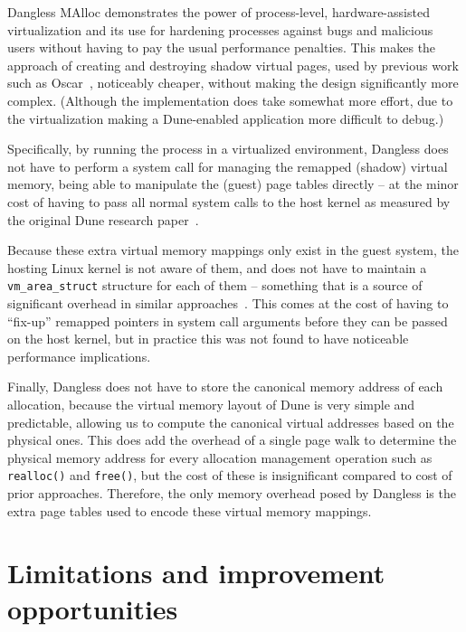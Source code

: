 
Dangless MAlloc demonstrates the power of process-level, hardware-assisted virtualization and its use for hardening processes against bugs and malicious users without having to pay the usual performance penalties. This makes the approach of creating and destroying shadow virtual pages, used by previous work such as Oscar~\cite{oscar2017}, noticeably cheaper, without making the design significantly more complex. (Although the implementation does take somewhat more effort, due to the virtualization making a Dune-enabled application more difficult to debug.)

Specifically, by running the process in a virtualized environment, Dangless does not have to perform a system call for managing the remapped (shadow) virtual memory, being able to manipulate the (guest) page tables directly -- at the minor cost of having to pass all normal system calls to the host kernel as measured by the original Dune research paper~\cite{dune-paper}.

Because these extra virtual memory mappings only exist in the guest system, the hosting Linux kernel is not aware of them, and does not have to maintain a \lstinline!vm_area_struct! structure for each of them -- something that is a source of significant overhead in similar approaches~\cite{oscar2017}. This comes at the cost of having to ``fix-up'' remapped pointers in system call arguments before they can be passed on the host kernel, but in practice this was not found to have noticeable performance implications.

Finally, Dangless does not have to store the canonical memory address of each allocation, because the virtual memory layout of Dune is very simple and predictable, allowing us to compute the canonical virtual addresses based on the physical ones. This does add the overhead of a single page walk to determine the physical memory address for every allocation management operation such as \lstinline!realloc()! and \lstinline!free()!, but the cost of these is insignificant compared to cost of prior approaches. Therefore, the only memory overhead posed by Dangless is the extra page tables used to encode these virtual memory mappings.

\section{Limitations and improvement opportunities}

